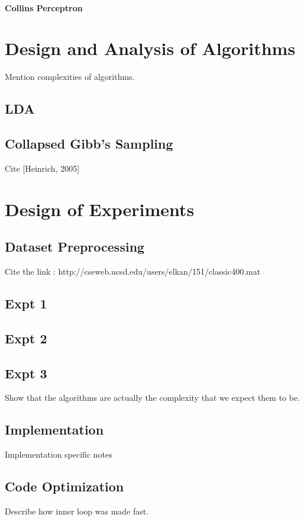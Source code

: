 \documentclass[11pt,a4paper,oneside]{article}
\begin{document}
\paragraph*{Collins Perceptron}

\section{Design and Analysis of Algorithms}

\label{sec:Algorithms}
Mention complexities of algorithms.

\subsection{LDA}

\subsection{Collapsed Gibb's Sampling}
Cite [Heinrich, 2005]

\section{Design of Experiments}

\subsection{Dataset Preprocessing}
Cite the link : http://cseweb.ucsd.edu/users/elkan/151/classic400.mat

\subsection{Expt 1}

\subsection{Expt 2}

\subsection{Expt 3}
Show that the algorithms are actually the complexity that we expect them to be.

\subsection{Implementation}
Implementation specific notes

\subsection{Code Optimization}
Describe how inner loop was made fast.
\end{document}
